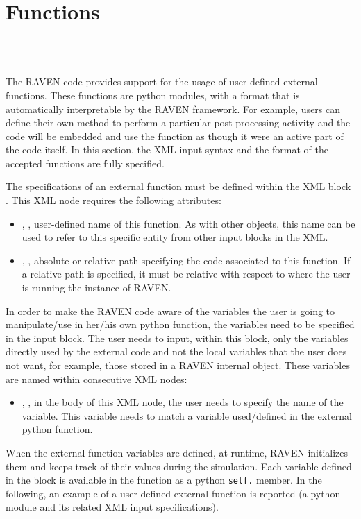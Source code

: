 \section{Functions}
\label{sec:functions}

\\
\\

The RAVEN code provides support for the usage of user-defined external
functions.
%
These functions are python modules, with a format that is automatically
interpretable by the RAVEN framework.
%
For example, users can define their own method to perform a particular
post-processing activity and the code will be embedded and use the function as
though it were an active part of the code itself.
%
In this section, the XML input syntax and the format of the accepted functions
are fully specified.

The specifications of an external function must be defined within the XML block
.
%
This XML node requires the following attributes:
\vspace{-5mm}
\begin{itemize}
  \itemsep0em
  \item {}, , user-defined name
  of this function.
  \nb As with other objects, this name can be used to refer to this
  specific entity from other input blocks in the XML.
  \item {}, , absolute or
  relative path specifying the code associated to this function.
  \nb If a relative path is specified, it must be relative with respect
  to where the user is running the instance of RAVEN.
\end{itemize}
\vspace{-5mm}
In order to make the RAVEN code aware of the variables the user is going to
manipulate/use in her/his own python function, the variables need to be
specified in the  input block.
%
The user needs to input, within this block, only the variables directly used by
the external code and not the local variables that the user does not want,
for example, those stored in a RAVEN internal object.
%
These variables are named within consecutive
 XML nodes:
\begin{itemize}
  \item {}, , in the body of
  this XML node, the user needs to specify the name of the variable.
  This variable needs to match a variable used/defined in the external python
  function.
\end{itemize}
When the external function variables are defined, at runtime, RAVEN initializes
them and keeps track of their values during the simulation.
%
Each variable defined in the  block is available in the
function as a python \texttt{self.} member. In the following, an example of a
user-defined external function is reported (a python module and its related XML
input specifications).

